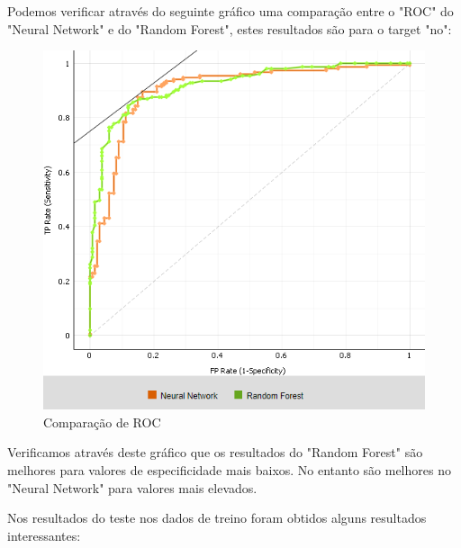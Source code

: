 Podemos verificar através do seguinte gráfico uma comparação entre o "ROC" do "Neural Network" e do "Random Forest", estes resultados são para o target "no":


\begin{figure}[H]
    \centering
    \includegraphics[scale=0.8]{images/roccompare.png}
     \caption{Comparação de ROC}
\end{figure}

Verificamos através deste gráfico que os resultados do "Random Forest" são melhores para valores de especificidade mais baixos. No entanto são melhores no "Neural Network" para valores mais elevados.


\newpage
Nos resultados do teste nos dados de treino foram obtidos alguns resultados interessantes:


